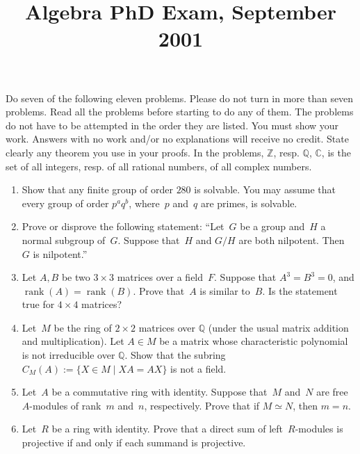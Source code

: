 \documentclass[11pt,letterpaper]{article}
\title{Algebra PhD Exam, September 2001}
\author{}
\date{}
\newenvironment{examproblems}[2]{%
  \def\ProblemHeadingTag{#2}%
  \AssignTaggingSocketPlug{block/list/label}{examproblem}%
  \begin{enumerate}%
  \setcounter{enumi}{#1}%
  \renewcommand{\labelenumi}{\textbf{\theenumi.}}%
  \setlength{\topsep}{0.35em}%
  \setlength{\partopsep}{0pt}%
  \setlength{\itemsep}{0.48em}%
  \setlength{\parsep}{0.18em}%
}{\end{enumerate}}
\newenvironment{examinstructions}{%
  \par\begingroup\itshape
}{%
  \par\endgroup\vspace{0.18em}
}
\begin{document}
\maketitle
\thispagestyle{empty}
\begin{examinstructions}
Do seven of the following eleven problems. Please do not turn in more than seven problems. Read all the problems before starting to do any of them. The problems do not have to be attempted in the order they are listed. You must show your work. Answers with no work and/or no explanations will receive no credit. State clearly any theorem you use in your proofs. In the problems, \(\mathbb Z\), resp. \(\mathbb Q\), \(\mathbb C\), is the set of all integers, resp. of all rational numbers, of all complex numbers.
\end{examinstructions}
\begin{examproblems}{0}{H2}
\def\ProblemHeadingText{Problem 1.}
\item
Show that any finite group of order \(280\) is solvable. You may assume that every group of order \(p^a q^b\), where~\(p\) and~\(q\) are primes, is solvable.
\def\ProblemHeadingText{Problem 2.}
\item
Prove or disprove the following statement: “Let~\(G\) be a group and~\(H\) a normal subgroup of~\(G\). Suppose that~\(H\) and \(G/H\) are both nilpotent. Then~\(G\) is nilpotent.”
\def\ProblemHeadingText{Problem 3.}
\item
Let \(A, B\) be two \(3 \times 3\) matrices over a field~\(F\). Suppose that \(A^3=B^3=0\), and \(\operatorname{rank}(A)=\operatorname{rank}(B)\). Prove that~\(A\) is similar to~\(B\). Is the statement true for \(4 \times 4\) matrices?
\def\ProblemHeadingText{Problem 4.}
\item
Let~\(M\) be the ring of \(2 \times 2\) matrices over \(\mathbb Q\) (under the usual matrix addition and multiplication). Let \(A\in M\) be a matrix whose characteristic polynomial is not irreducible over \(\mathbb Q\). Show that the subring \(C_M(A):=\{X\in M\mid XA=AX\}\) is not a field.
\def\ProblemHeadingText{Problem 5.}
\item
Let~\(A\) be a commutative ring with identity. Suppose that~\(M\) and~\(N\) are free~\(A\)-modules of rank~\(m\) and~\(n\), respectively. Prove that if \(M\simeq N\), then \(m=n\).
\def\ProblemHeadingText{Problem 6.}
\item
Let~\(R\) be a ring with identity. Prove that a direct sum of left~\(R\)-modules is projective if and only if each summand is projective.
\def\ProblemHeadingText{Problem 7.}

\end{examproblems}
\end{document}
